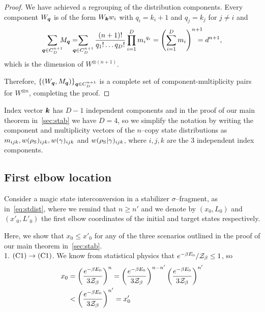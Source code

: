 \begin{proof}
We have achieved a regrouping of the distribution components.
Every component $W_{\bm{q}}$ is of the form $W_{\bm{k}} w_i$ with $q_i = k_i + 1$ and $q_j = k_j$ for $j\neq i$ and 
\begin{align*}
	\sum_{\bmq \in C_D^{n+1}}  \hspace{-6pt} M_{\bmq} =  \hspace{-10pt} \sum_{\bmq \in C_D^{n+1}} \frac{(n+1)!}{q_1!\dots q_D!} \prod\limits_{i=1}^D {m_i}^{q_i} = 
	\left( \sum_{i=1}^D m_i \right)^{n+1} \hspace{-10pt} = d^{n+1},
\end{align*}
which is the dimension of $W^{\otimes (n+1)}$.

Therefore, $\{ (W_{\bm{q}}, M_{\bm{q}}) \}_{\bm{q} \in C_D^{n+1}}$ is a complete set of component-multiplicity pairs for $W^{\otimes n}$, completing the proof.
\end{proof}

Index vector $\bm{k}$ has $D-1$ independent components and in the proof of our main theorem in~\cref{sec:stab} we have $D=4$, so we simplify the notation by writing the component and multiplicity vectors of the $n$--copy state distributions as $m_{ijk}, w(\rho_{\rm{S}})_{ijk}, w(\gamma)_{ijk}$ and $w(\rho_{\rm{S}}|\gamma)_{ijk}$, where $i,j,k$ are the 3 independent index components.

\subsection{First elbow location}
\label{app:first_elb_loc}
Consider a magic state interconversion in a stabilizer $\sigma$--fragment, as in~\cref{eq:stdist}, where we remind that $n \geq n'$ and we denote by $(x_0, L_0)$ and $(x'_0, L'_0)$ the first elbow coordinates of the initial and target states respectively.

Here, we show that $x_0 \leq x'_0$ for any of the three scenarios outlined in the proof of our main theorem in~\cref{sec:stab}.\\

1. $\rm{(C1)} \rightarrow \rm{(C1)}$.
We know from statistical physics that $e^{-\beta E_0} / \mathcal{Z}_\beta \leq 1$, so
	\begin{align*}
		x_0 &= \left(\dfrac{e^{-\beta E_0}}{3\mathcal{Z}_\beta}\right)^n = \left(\dfrac{e^{-\beta E_0}}{3\mathcal{Z}_\beta}\right)^{n-n'} \left(\dfrac{e^{-\beta E_0}}{3\mathcal{Z}_\beta}\right)^{n'} \\
		&< \left(\dfrac{e^{-\beta E_0}}{3\mathcal{Z}_\beta}\right)^{n'} = x_0'		
	\end{align*}

